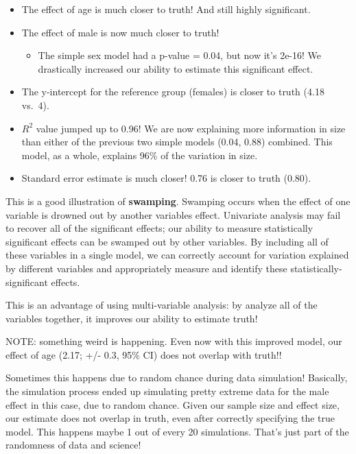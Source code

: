 \documentclass[
]{article}
\providecommand{\tightlist}{%
  \setlength{\itemsep}{0pt}\setlength{\parskip}{0pt}}
\begin{document}
\begin{itemize}
\tightlist
\item
  The effect of age is much closer to truth! And still highly
  significant.
\item
  The effect of male is now much closer to truth!

  \begin{itemize}
  \tightlist
  \item
    The simple sex model had a p-value = 0.04, but now it's 2e-16! We
    drastically increased our ability to estimate this significant
    effect.
  \end{itemize}
\item
  The y-intercept for the reference group (females) is closer to truth
  (4.18 vs.~4).
\item
  \(R^2\) value jumped up to 0.96! We are now explaining more
  information in size than either of the previous two simple models
  (0.04, 0.88) combined. This model, as a whole, explains 96\% of the
  variation in size.
\item
  Standard error estimate is much closer! 0.76 is closer to truth
  (0.80).
\end{itemize}

This is a good illustration of \textbf{swamping}. Swamping occurs when
the effect of one variable is drowned out by another variables effect.
Univariate analysis may fail to recover all of the significant effects;
our ability to measure statistically significant effects can be swamped
out by other variables. By including all of these variables in a single
model, we can correctly account for variation explained by different
variables and appropriately measure and identify these
statistically-significant effects.

This is an advantage of using multi-variable analysis: by analyze all of
the variables together, it improves our ability to estimate truth!

NOTE: something weird is happening. Even now with this improved model,
our effect of age (2.17; +/- 0.3, 95\% CI) does not overlap with truth!!

Sometimes this happens due to random chance during data simulation!
Basically, the simulation process ended up simulating pretty extreme
data for the male effect in this case, due to random chance. Given our
sample size and effect size, our estimate does not overlap in truth,
even after correctly specifying the true model. This happens maybe 1 out
of every 20 simulations. That's just part of the randomness of data and
science!
\end{document}
